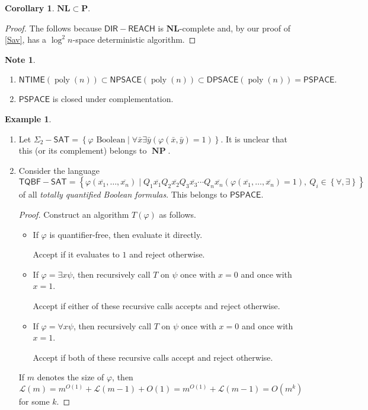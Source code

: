\documentclass[10pt,letterpaper,cm]{nupset}
\theoremstyle{definition}
\newtheorem{exmp}[definition]{Example}
\newtheorem{note}[definition]{Note}
\theoremstyle{theorem}
\newtheorem{corollary}[definition]{Corollary}
\theoremstyle{remark}
\newcommand{\1}{\mathbf{1}}
\newcommand{\0}{\vec 0}
\DeclareMathOperator{\poly}{poly}
\DeclareMathOperator{\NP}{\mathbf{NP}}
\begin{document}
\begin{corollary}
$\mathbf{NL} \subset \mathbf{P}$.
\end{corollary}
\begin{proof}
The follows because $\mathsf{DIR{-}REACH}$ is  $\mathbf{NL}$-complete and, by our proof of \cref{Sav}, has a \linebreak $\log^2{n}$-space deterministic algorithm.
\end{proof}

\begin{note} $ $
\begin{enumerate}
\item $\mathsf{NTIME}(\poly(n)) \subset \mathsf{NPSACE}(\poly(n)) \subset \mathsf{DPSACE}(\poly(n)) = \mathsf{PSPACE}.$
\item $\mathsf{PSPACE}$ is closed under complementation. 
\end{enumerate}
\end{note}

\begin{exmp} $ $
\begin{enumerate}
\item Let $\Sigma_2{-}\mathsf{SAT} = \left\{\varphi \text{ Boolean} \mid \forall \bar{x} \exists \bar{y}\left(\varphi(\bar{x}, \bar{y}) = 1\right)\right\}$. It is unclear that this (or its complement) belongs to $\NP$. 
\item Consider the language $$\mathsf{TQBF{-}SAT} = \left\{ \varphi\left(\overline{x_1}, \ldots, \overline{x_n}\right) \mid Q_1 \overline{x_1} Q_2 \overline{x_2}Q_3 \overline{x_3} \cdots Q_n \overline{x_n} \left(\varphi\left(\overline{x_1}, \ldots, \overline{x_n}\right) = 1\right), \ Q_i \in \left\{\forall, \exists\right\} \right\}$$  of all \textit{totally quantified Boolean formulas}. This belongs to $\mathsf{PSPACE}$.
\begin{proof}
Construct an algorithm $T(\varphi)$ as follows. 
\begin{itemize}
\item If $\varphi$ is quantifier-free, then evaluate it directly. 

Accept if it evaluates to $1$ and reject otherwise. 
\item If $\varphi = \exists x \psi$, then recursively call $T$ on $\psi$ once with $x=0$ and once with $x=1$. 

Accept if either of these recursive calls accepts and reject otherwise. 
\item If  $\varphi = \forall x \psi$, then recursively call $T$ on $\psi$ once with $x=0$ and once with $x=1$. 

Accept if both of these recursive calls accept and reject otherwise. 
\end{itemize} 
If $m$ denotes the size of $\varphi$, then $$\mathcal{L}(m) = m^{O(1)} + \mathcal{L}(m-1) + O(1) = m^{O(1)} + \mathcal{L}(m-1) = O(m^k)$$ for some $k$.
\end{proof}
\end{enumerate}
\end{exmp}
\end{document}
